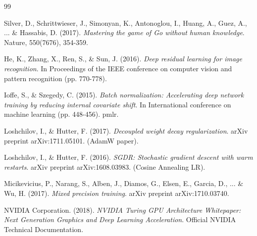 \documentclass[11pt,a4paper]{report}
\begin{document}
\begin{thebibliography}{99}

Silver, D., Schrittwieser, J., Simonyan, K., Antonoglou, I., Huang, A., Guez, A., ... \& Hassabis, D. (2017). 
\textit{Mastering the game of Go without human knowledge}. 
Nature, 550(7676), 354-359.

He, K., Zhang, X., Ren, S., \& Sun, J. (2016). 
\textit{Deep residual learning for image recognition}. 
In Proceedings of the IEEE conference on computer vision and pattern recognition (pp. 770-778).

Ioffe, S., \& Szegedy, C. (2015). 
\textit{Batch normalization: Accelerating deep network training by reducing internal covariate shift}. 
In International conference on machine learning (pp. 448-456). pmlr.

Loshchilov, I., \& Hutter, F. (2017). 
\textit{Decoupled weight decay regularization}. 
arXiv preprint arXiv:1711.05101. (AdamW paper).

Loshchilov, I., \& Hutter, F. (2016). 
\textit{SGDR: Stochastic gradient descent with warm restarts}. 
arXiv preprint arXiv:1608.03983. (Cosine Annealing LR).

Micikevicius, P., Narang, S., Alben, J., Diamos, G., Elsen, E., Garcia, D., ... \& Wu, H. (2017). 
\textit{Mixed precision training}. 
arXiv preprint arXiv:1710.03740.

NVIDIA Corporation. (2018). 
\textit{NVIDIA Turing GPU Architecture Whitepaper: Next Generation Graphics and Deep Learning Acceleration}. 
Official NVIDIA Technical Documentation.

\end{thebibliography}
\end{document}
